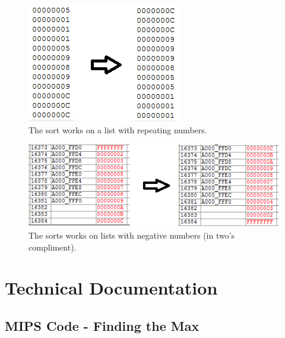 \documentclass[11pt]{article}
\begin{document}
\begin{figure}[h!]
\centering
\includegraphics[scale=0.9]{sort3.png}
\caption{The sort works on a list with repeating numbers.}
\label{fig:sort3}
\end{figure} 

\begin{figure}[h!]
\centering
\includegraphics[scale=0.9]{sort4.png}
\caption{The sorts works on lists with negative numbers (in two's compliment).}
\label{fig:sort4}
\end{figure} 

\clearpage



\section{Technical Documentation}

\subsection{MIPS Code - Finding the Max}
\end{document}
